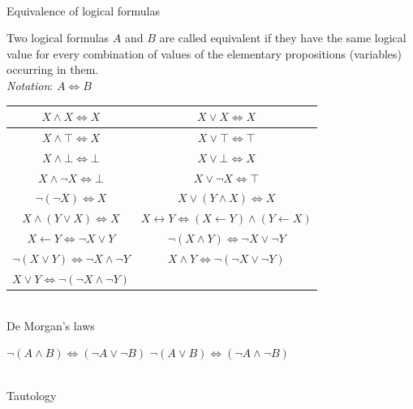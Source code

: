 \begin{frame}{\\Equivalence of logical formulas}
	\topline
	\\
	\footnotesize{
		Two logical formulas $A$ and $B$ are called equivalent if they have the same logical value for every combination of values of the elementary propositions (variables) occurring in them.\\
		\textit{Notation}: $A \iff B$
		\begin{center}
			\begin{tabular}{|c|c|}
				\hline
				$X \land X \iff X$ & $X \lor X \iff X$\\
				\hline
				$X \land \top \iff X$ & $X \lor \top \iff \top$\\
				\hline
				$X \land \bot \iff \bot$ & $X \lor \bot \iff X$\\
				\hline
				$X \land \neg X \iff \bot$ & $X \lor \neg X \iff \top$\\
				\hline
				$\neg(\neg X) \iff X$ & $X \lor (Y \land X) \iff X$\\
				\hline
				$X \land (Y \lor X) \iff X$ & $X \leftrightarrow Y \iff (X \leftarrow Y) \land (Y \leftarrow X)$\\
				\hline
				$X \leftarrow Y \iff \neg X \lor Y$ & $\neg(X \land Y) \iff \neg X \lor \neg Y$\\
				\hline
				$\neg(X \lor Y) \iff \neg X \land \neg Y$ & $X \land Y \iff \neg(\neg X \lor \neg Y)$\\
				\hline
				$X \lor Y \iff \neg(\neg X \land \neg Y)$ &\\
				\hline
			\end{tabular}
		\end{center}
	}
\end{frame}

\begin{frame}{\\De Morgan's laws}
	\topline
	\justifying
	\Huge
	\begin{center}
		$\neg(A \land B) \iff (\neg A \lor \neg B) $
		$\neg(A \lor B) \iff (\neg A \land \neg B) $
	\end{center}
\end{frame}

\begin{frame}{\\Tautology}
	\topline
	\justifying
	\begin{SCn}
	\end{SCn}
\end{frame}

